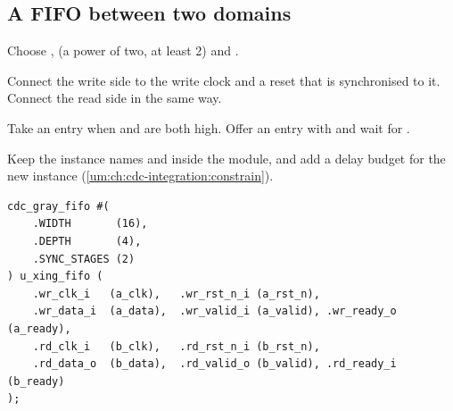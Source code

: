 \subsection{A FIFO between two domains}
\begin{procedure}
  \item Choose ,  (a power of two, at least 2) and .
  \item Connect the write side to the write clock and a reset that is synchronised to it. Connect the read side in the same way.
  \item Take an entry when  and  are both high. Offer an entry with  and wait for .
  \item Keep the instance names  and  inside the module, and add a delay budget for the new instance (\cref{um:ch:cdc-integration:constrain}).
\end{procedure}
\begin{lstlisting}
cdc_gray_fifo #(
    .WIDTH       (16),
    .DEPTH       (4),
    .SYNC_STAGES (2)
) u_xing_fifo (
    .wr_clk_i   (a_clk),   .wr_rst_n_i (a_rst_n),
    .wr_data_i  (a_data),  .wr_valid_i (a_valid), .wr_ready_o (a_ready),
    .rd_clk_i   (b_clk),   .rd_rst_n_i (b_rst_n),
    .rd_data_o  (b_data),  .rd_valid_o (b_valid), .rd_ready_i (b_ready)
);
\end{lstlisting}

